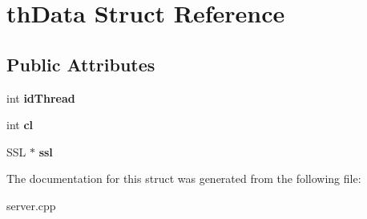 \hypertarget{structthData}{\section{th\-Data Struct Reference}
\label{structthData}
}
\subsection*{Public Attributes}
\begin{DoxyCompactItemize}
\item 
\hypertarget{structthData_a54d836b454acf32c0fa48a8ce1d8ca9f}{int {\bfseries id\-Thread}}\label{structthData_a54d836b454acf32c0fa48a8ce1d8ca9f}

\item 
\hypertarget{structthData_acb4e5f4e2409c70ccf0f44c1a1d9bd28}{int {\bfseries cl}}\label{structthData_acb4e5f4e2409c70ccf0f44c1a1d9bd28}

\item 
\hypertarget{structthData_a6127b232b4459c34fd38dbf02d8dfd16}{S\-S\-L $\ast$ {\bfseries ssl}}\label{structthData_a6127b232b4459c34fd38dbf02d8dfd16}

\end{DoxyCompactItemize}


The documentation for this struct was generated from the following file\-:\begin{DoxyCompactItemize}
\item 
server.\-cpp\end{DoxyCompactItemize}

